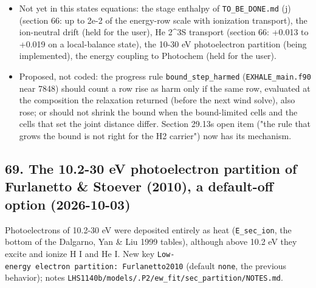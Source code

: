 \documentclass[english,a4paper]{my_memo}
\begin{document}
\begin{itemize}
  0.5680 percent-angstrom (2.6\% apart). Observed 1.1084 +- 0.0289.
\item
  Not yet in this state\textquotesingle s equations: the stage enthalpy of \texttt{TO\_BE\_DONE.md}
  (j) (section 66: up to 2e-2 of the energy-row scale with ionization
  transport), the ion-neutral drift (held for the user), He 2\^{}3S transport
  (section 66: +0.013 to +0.019 on a local-balance state), the 10-30 eV
  photoelectron partition (being implemented), the energy coupling to
  Photochem (held for the user).
\item
  Proposed, not coded: the progress rule \texttt{bound\_step\_harmed}
  (\texttt{EXHALE\_main.f90} near 7848) should count a row rise as harm only if the
  same row, evaluated at the composition the relaxation returned (before the
  next wind solve), also rose; or should not shrink the bound when the
  bound-limited cells and the cells that set the joint distance differ.
  Section 29.13\textquotesingle s open item ("the rule that grows the bound is not right
  for the H2 carrier") now has its mechanism.
\end{itemize}

\subsection{69. The 10.2-30 eV photoelectron partition of Furlanetto \& Stoever (2010), a default-off option (2026-10-03)}\label{69-the-102-30-ev-photoelectron-partition-of-furlanetto--stoever-2010-a-default-off-option-2026-10-03}

Photoelectrons of 10.2-30 eV were deposited entirely as heat (\texttt{E\_sec\_ion},
the bottom of the Dalgarno, Yan \& Liu 1999 tables), although above 10.2 eV
they excite and ionize H I and He I. New key
\texttt{Low-energy\ electron\ partition:\ Furlanetto2010} (default \texttt{none}, the
previous behavior); notes \texttt{LHS1140b/models/.P2/ew\_fit/sec\_partition/NOTES.md}.
\end{document}
